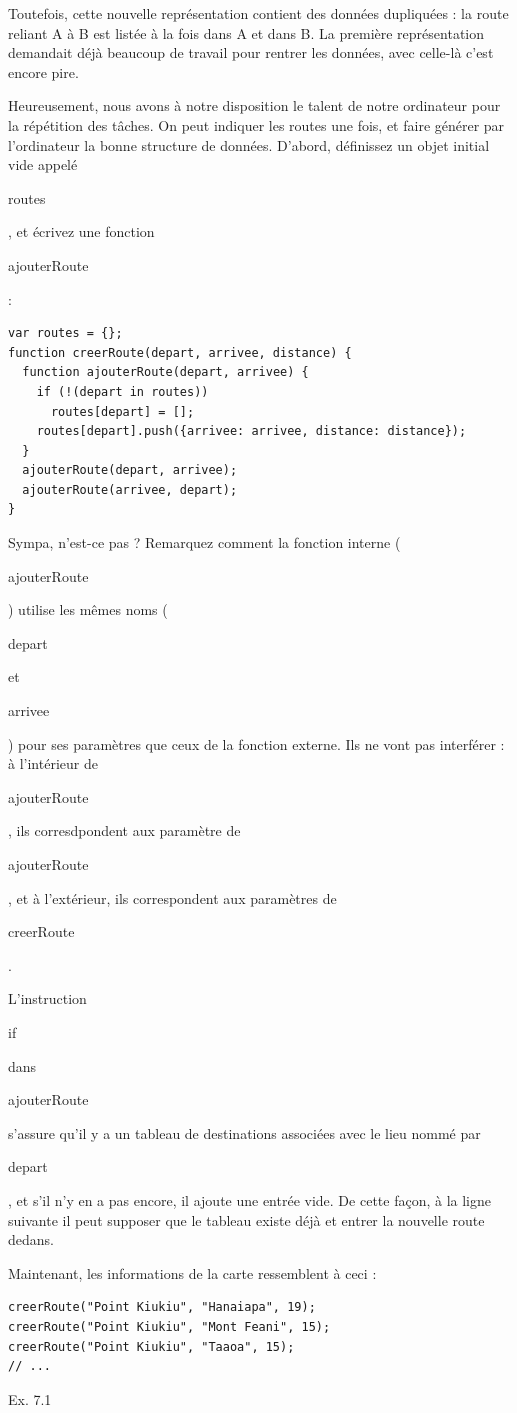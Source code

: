 \documentclass{FramateX}
\renewcommand{\texttt}[1]{\begin{sffamily}{#1}\end{sffamily}}
\begin{document}
\begin{center}\end{center}

Toutefois, cette nouvelle représentation contient des données dupliquées
: la route reliant A à B est listée à la fois dans A et dans B. La
première représentation demandait déjà beaucoup de travail pour rentrer
les données, avec celle-là c'est encore pire.

Heureusement, nous avons à notre disposition le talent de notre
ordinateur pour la répétition des tâches. On peut indiquer les routes
une fois, et faire générer par l'ordinateur la bonne structure de
données. D'abord, définissez un objet initial vide appelé
\texttt{routes}, et écrivez une fonction \texttt{ajouterRoute} :

\begin{lstlisting}
var routes = {};
function creerRoute(depart, arrivee, distance) {
  function ajouterRoute(depart, arrivee) {
    if (!(depart in routes))
      routes[depart] = [];
    routes[depart].push({arrivee: arrivee, distance: distance});
  }
  ajouterRoute(depart, arrivee);
  ajouterRoute(arrivee, depart);
}
\end{lstlisting}
Sympa, n'est-ce pas ? Remarquez comment la fonction interne
(\texttt{ajouterRoute}) utilise les mêmes noms (\texttt{depart} et
\texttt{arrivee}) pour ses paramètres que ceux de la fonction externe.
Ils ne vont pas interférer : à l'intérieur de \texttt{ajouterRoute}, ils
corresdpondent aux paramètre de \texttt{ajouterRoute}, et à l'extérieur,
ils correspondent aux paramètres de \texttt{creerRoute}.

L'instruction \texttt{if} dans \texttt{ajouterRoute} s'assure qu'il y a
un tableau de destinations associées avec le lieu nommé par
\texttt{depart}, et s'il n'y en a pas encore, il ajoute une entrée vide.
De cette façon, à la ligne suivante il peut supposer que le tableau
existe déjà et entrer la nouvelle route dedans.

Maintenant, les informations de la carte ressemblent à ceci :

\begin{lstlisting}
creerRoute("Point Kiukiu", "Hanaiapa", 19);
creerRoute("Point Kiukiu", "Mont Feani", 15);
creerRoute("Point Kiukiu", "Taaoa", 15);
// ...
\end{lstlisting}
\begin{center}\end{center}

Ex. 7.1
\end{document}
